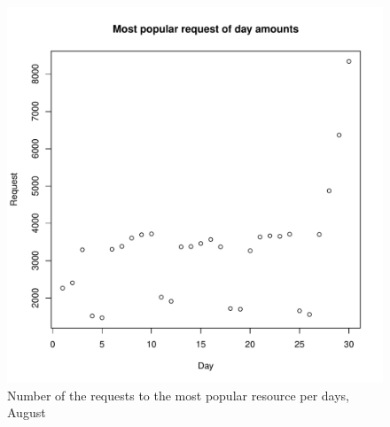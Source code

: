 \documentclass[english]{article}
\begin{document}
\begin{figure}[H]
\centerline{\includegraphics{Weblogs/Aug/MostPopularRequestOfDayAmounts.pdf}}
\caption{Number of the requests to the most popular resource per days, August}
\end{figure}
\end{document}
